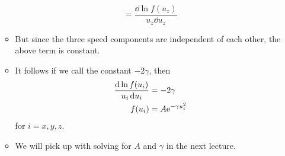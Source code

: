 \documentclass[../notes.tex]{subfiles}
\begin{document}
\begin{itemize}
\begin{itemize}
\begin{equation*}
            = \frac{\dd{\ln f(u_z)}}{u_z\dd{u_z}}
        \end{equation*}
        \item But since the three speed components are independent of each other, the above term is constant.
        \item It follows if we call the constant $-2\gamma$, then
        \begin{align*}
            \frac{\dd{\ln f(u_i)}}{u_i\dd{u_i}} &= -2\gamma\\
            f(u_i) &= A\e[-\gamma u_i^2]
        \end{align*}
        for $i=x,y,z$.
        \item We will pick up with solving for $A$ and $\gamma$ in the next lecture.
    \end{itemize}
\end{itemize}
\end{document}
